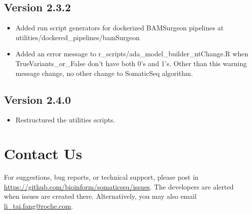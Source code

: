 \documentclass[10pt,letterpaper]{article}
\begin{document}
\begin{sloppypar}
\begin{itemize}
\end{itemize}



\subsection{Version 2.3.2}

\begin{itemize}

  \item
  Added run script generators for dockerized BAMSurgeon pipelines at utilities/dockered\_pipelines/bamSurgeon
  
  \item
  Added an error message to r\_scripts/ada\_model\_builder\_ntChange.R when TrueVariants\_or\_False don't have both 0's and 1's. Other than this warning message change, no other change to SomaticSeq algorithm.  

\end{itemize}


\subsection{Version 2.4.0}

\begin{itemize}

  \item
  Restructured the utilities scripts. 

\end{itemize}





\section{Contact Us}
For suggestions, bug reports, or technical support, please post in \href{https://github.com/bioinform/somaticseq/issues}{https://github.com/bioinform/somaticseq/issues}. The developers are alerted when issues are created there. Alternatively, you may also email \href{mailto:li_tai.fang@roche.com}{li\_tai.fang@roche.com}. 

\end{sloppypar}
\end{document}
